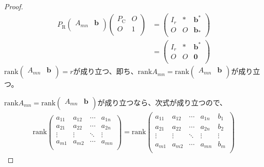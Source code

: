 \documentclass[dvipdfmx]{jsarticle}
\begin{document}
\begin{proof}
\begin{align*}
P_{\mathrm{R}}\begin{pmatrix}
A_{mn} & \mathbf{b} \\
\end{pmatrix}\begin{pmatrix}
P_{\mathrm{C}} & O \\
O & 1 \\
\end{pmatrix} &= \begin{pmatrix}
I_{r} & * & \mathbf{b}^{*} \\
O & O & \mathbf{b}_{*} \\
\end{pmatrix}\\
&= \begin{pmatrix}
I_{r} & * & \mathbf{b}^{*} \\
O & O & \mathbf{0} \\
\end{pmatrix}
\end{align*}
${\mathrm{rank}}\begin{pmatrix}
A_{mn} & \mathbf{b} \\
\end{pmatrix} = r$が成り立つ、即ち、${\mathrm{rank}}A_{mn} = {\mathrm{rank}}\begin{pmatrix}
A_{mn} & \mathbf{b} \\
\end{pmatrix}$が成り立つ。\par
${\mathrm{rank}}A_{mn} = {\mathrm{rank}}\begin{pmatrix}
A_{mn} & \mathbf{b} \\
\end{pmatrix}$が成り立つなら、次式が成り立つので、
\begin{align*}
{\mathrm{rank}}\begin{pmatrix}
a_{11} & a_{12} & \cdots & a_{1n} \\
a_{21} & a_{22} & \cdots & a_{2n} \\
 \vdots & \vdots & \ddots & \vdots \\
a_{m1} & a_{m2} & \cdots & a_{mn} \\
\end{pmatrix} = {\mathrm{rank}}\begin{pmatrix}
a_{11} & a_{12} & \cdots & a_{1n} & b_{1} \\
a_{21} & a_{22} & \cdots & a_{2n} & b_{2} \\
 \vdots & \vdots & \ddots & \vdots & \vdots \\
a_{m1} & a_{m2} & \cdots & a_{mn} & b_{m} \\

\end{pmatrix}
\end{align*}
\end{proof}
\end{document}
